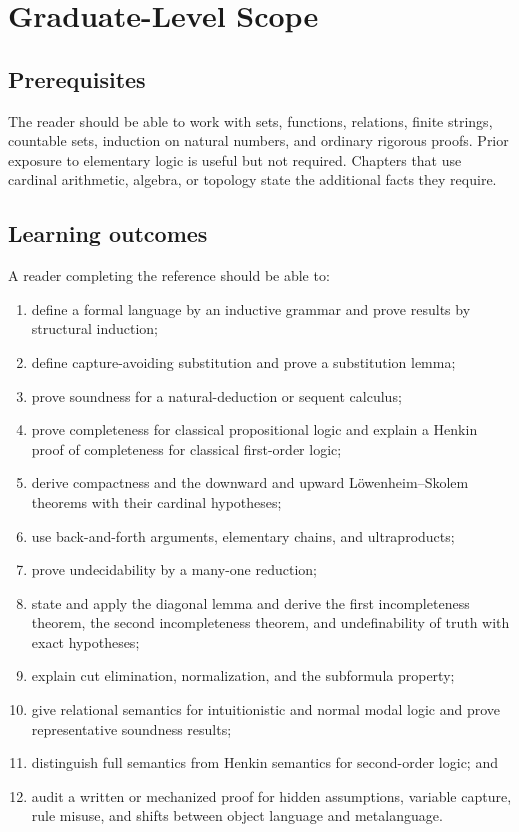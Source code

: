 \chapter*{Graduate-Level Scope}

\section*{Prerequisites}

The reader should be able to work with sets, functions, relations, finite
strings, countable sets, induction on natural numbers, and ordinary rigorous
proofs.  Prior exposure to elementary logic is useful but not
required.  Chapters that use cardinal arithmetic, algebra, or topology state
the additional facts they require.

\section*{Learning outcomes}

A reader completing the reference should be able to:
\begin{enumerate}
  \item define a formal language by an inductive grammar and prove results by
        structural induction;
  \item define capture-avoiding substitution and prove a substitution lemma;
  \item prove soundness for a natural-deduction or sequent calculus;
  \item prove completeness for classical propositional logic and explain a
        Henkin proof of completeness for classical first-order logic;
  \item derive compactness and the downward and upward L\"owenheim--Skolem
        theorems with their cardinal hypotheses;
  \item use back-and-forth arguments, elementary chains, and ultraproducts;
  \item prove undecidability by a many-one reduction;
  \item state and apply the diagonal lemma and derive the first incompleteness
        theorem, the second incompleteness theorem, and undefinability of truth
        with exact hypotheses;
  \item explain cut elimination, normalization, and the subformula property;
  \item give relational semantics for intuitionistic and normal modal logic and
        prove representative soundness results;
  \item distinguish full semantics from Henkin semantics for second-order logic;
        and
  \item audit a written or mechanized proof for hidden assumptions, variable
        capture, rule misuse, and shifts between object language and
        metalanguage.
\end{enumerate}

\tableofcontents

\mainmatter

